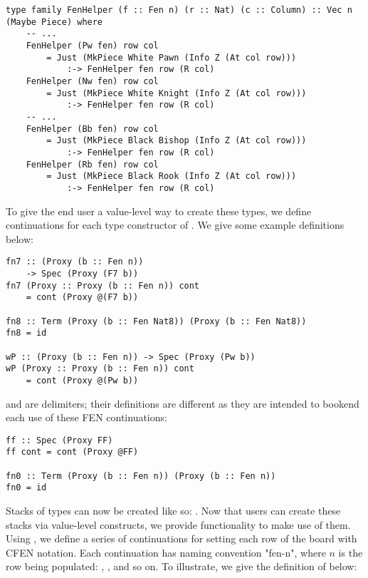 \begin{lstlisting}
type family FenHelper (f :: Fen n) (r :: Nat) (c :: Column) :: Vec n (Maybe Piece) where
    -- ...
    FenHelper (Pw fen) row col
        = Just (MkPiece White Pawn (Info Z (At col row)))
            :-> FenHelper fen row (R col)
    FenHelper (Nw fen) row col
        = Just (MkPiece White Knight (Info Z (At col row)))
            :-> FenHelper fen row (R col)
    -- ...
    FenHelper (Bb fen) row col
        = Just (MkPiece Black Bishop (Info Z (At col row)))
            :-> FenHelper fen row (R col)
    FenHelper (Rb fen) row col
        = Just (MkPiece Black Rook (Info Z (At col row)))
            :-> FenHelper fen row (R col)
\end{lstlisting}

To give the end user a value-level way to create these  types, we define continuations for each type constructor of . We give some example definitions below:

\begin{lstlisting}
fn7 :: (Proxy (b :: Fen n))
    -> Spec (Proxy (F7 b))
fn7 (Proxy :: Proxy (b :: Fen n)) cont
    = cont (Proxy @(F7 b))

fn8 :: Term (Proxy (b :: Fen Nat8)) (Proxy (b :: Fen Nat8))
fn8 = id

wP :: (Proxy (b :: Fen n)) -> Spec (Proxy (Pw b))
wP (Proxy :: Proxy (b :: Fen n)) cont
    = cont (Proxy @(Pw b))
\end{lstlisting}

 and  are delimiters; their definitions are different as they are intended to bookend each use of these FEN continuations:

\begin{lstlisting}
ff :: Spec (Proxy FF)
ff cont = cont (Proxy @FF)

fn0 :: Term (Proxy (b :: Fen n)) (Proxy (b :: Fen n))
fn0 = id
\end{lstlisting}

Stacks of  types can now be created like so: . Now that users can create these stacks via value-level constructs, we provide functionality to make use of them. Using , we define a series of continuations for setting each row of the board with CFEN notation. Each continuation has naming convention "fen-n", where $n$ is the row being populated: , , and so on. To illustrate, we give the definition of  below:

